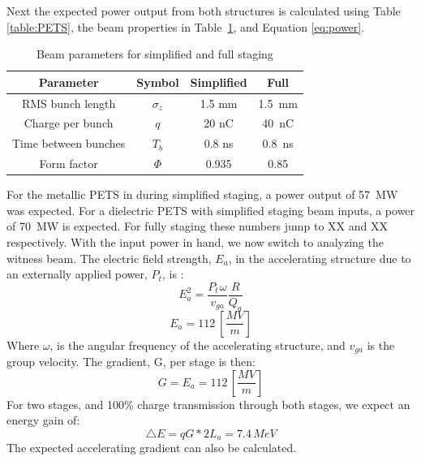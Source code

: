 Next the expected power output from both structures is calculated using Table \ref{table:PETS}, 
the beam properties in Table~\ref{table:beam1}, and Equation \ref{eq:power}. 
\begin{table}
	\begin{center}
		\caption{Beam parameters for simplified and full staging}
		\label{table:beam1}
		\begin{tabular}{cccc}  
			\toprule
			\toprule
			\textbf{Parameter} & \textbf{Symbol} & \textbf{Simplified} & \textbf{Full} \\
			\midrule
			RMS bunch length & $\sigma_{z}$ & 1.5 mm & \SI{1.5}{mm}\\  
			Charge per bunch & $q$ & 20 nC & \SI{40}{nC}\\  
			Time between bunches & $T_{b}$ & 0.8 ns & \SI{0.8}{ns}\\  
			Form factor 		 & $\Phi$ & 0.935 & \SI{0.85}{}\\  
			\bottomrule
		\end{tabular}
	\end{center}
\end{table}
For the metallic PETS in during simplified staging, a power output of \SI{57}{MW} was expected.
For a dielectric PETS with simplified staging beam inputs, a power of \SI{70}{MW} is expected.
For fully staging these numbers jump to XX and XX respectively.
With the input power in hand, we now switch to analyzing the 
witness beam. The electric field strength, $E_{a}$, in 
the accelerating structure due to an externally applied power,
$P_{t}$, is \cite{wangler}: 
\begin{equation}
E_{a}^{2}=\frac{P_{t\,}\omega}{v_{ga}}\frac{R}{Q_a}
\label{eq:electricfield}
\end{equation}
\begin{equation}
E_{a}=112\:\left[\frac{MV}{m}\right]
\end{equation}
Where $\omega$, is the angular frequency of the accelerating structure,
and $v_{ga}$ is the group velocity. The gradient, G, per stage is
then: 
\begin{equation}
G=E_{a}=112\,\left[\frac{MV}{m}\right]
\end{equation}
For two stages, and 100\% charge transmission through both stages,
we expect an energy gain of: 
\begin{equation}
\triangle E=qG*2L_{a}=7.4\,MeV
\end{equation}
The expected accelerating gradient can also be calculated. 







